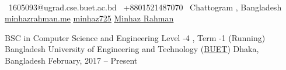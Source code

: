 \documentclass[]{awesome-cv}
\begin{document}
    
\begin{center}
	  \\
	\vspace{2mm}
	{\faEnvelope\ 1605093@ugrad.cse.buet.ac.bd} \hspace{5mm} {\faMobile\ +8801521487070}  \hspace{5mm} {\faMapMarker\ Chattogram , Bangladesh} \hspace{5mm} {\faLink\href{https://minhazrahman.me}{\underline{minhazrahman.me}}}  {\faGithub \href{https://github.com/minhaz725}{\underline{minhaz725}}} \hspace{5mm} {\faLinkedin \href{https://www.linkedin.com/in/minhazur-rahman-3a315a159/}{\underline{Minhaz Rahman}}}
\end{center}
\begin{cventries}
	\cventry
	{BSC in Computer Science and Engineering \newline Level -4 , Term -1 (Running)}
	{Bangladesh University of Engineering and Technology (\href{https://www.buet.ac.bd/}{\underline{BUET}})}
	{Dhaka, Bangladesh}
	{February, 2017 – Present}
	{}
\end{cventries}

\vspace{-4mm}
\end{document}
